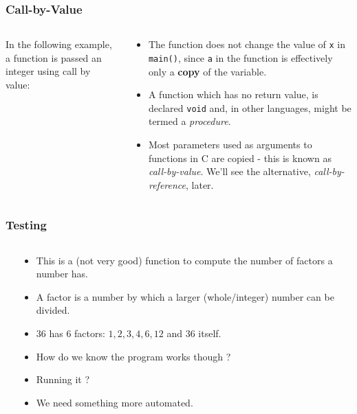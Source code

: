 \begin{frame}[fragile]
\frametitle{Call-by-Value}

\begin{columns}

\begin{column}{0.45\textwidth}
In the following example, a function is passed an integer
using call by value:

\end{column}

\pause
\begin{column}{0.45\textwidth}
\begin{itemize}[<+->]
\item The function does not change the value of \verb^x^ in
\verb^main()^, since {\tt a} in the function is effectively
only a {\bf copy} of the variable.
\item A function which has no return value, is declared \verb^void^
and, in other languages, might be termed a {\it procedure}.
\item Most parameters used as arguments to functions in C are copied - this is known as {\it call-by-value}. We'll see the alternative, {\it call-by-reference}, later.
\end{itemize}
\end{column}

\end{columns}
\end{frame}



\begin{frame}[fragile]
\frametitle{Testing}
\begin{columns}

\pause
\begin{column}{0.40\textwidth}

\end{column}

\begin{column}{0.50\textwidth}
\begin{itemize}[<+->]
\item This is a (not very good) function to compute the number of factors a number has.
\item A factor is a number by which a larger (whole/integer) number can be divided.
\item $36$ has $6$ factors: $1, 2, 3, 4, 6, 12$ and $36$ itself.
\item How do we know the program works though ?
\item Running it ? 
\item We need something more automated.
\end{itemize}
\end{column}

\end{columns}
\end{frame}


